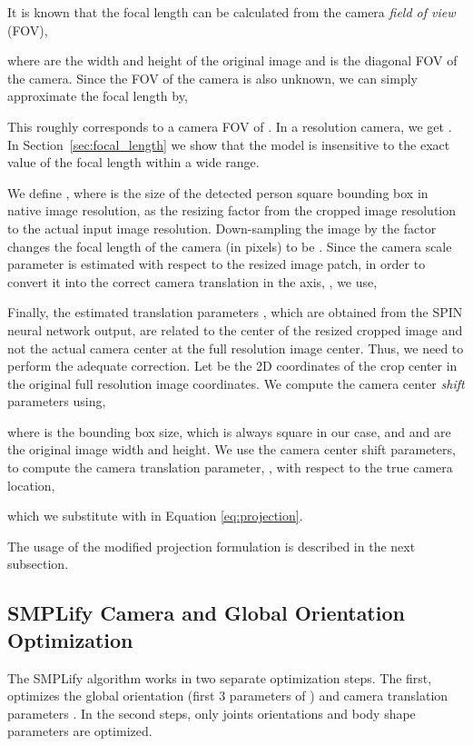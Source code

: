 \documentclass[runningheads]{llncs}
\begin{document}
It is known that the focal length can be calculated from the camera \emph{field of view} (FOV),

where  are the width and height of the original image and  is the diagonal FOV of the camera. Since the FOV of the camera is also unknown, we can simply approximate the focal length by,

This roughly corresponds to a camera FOV of . In a  resolution camera, we get . In Section~\ref{sec:focal_length} we show that the model is insensitive to the exact value of the focal length within a wide range. 

 We define , where  is the size of the detected person square bounding box in native image resolution, as the resizing factor from the  cropped image resolution to the actual input image resolution. Down-sampling the image by the factor  changes the focal length of the camera (in pixels) to be . Since the camera scale parameter  is estimated with respect to the resized image patch, in order to convert it into the correct camera translation in the  axis, , we use,






Finally, the estimated translation parameters , which are obtained from the SPIN neural network output, are related to the center of the resized cropped image and not the actual camera center at the full resolution image center. Thus, we need to perform the adequate correction.  Let  be the 2D coordinates of the crop center in the original full resolution image coordinates. We compute the  camera center \emph{shift} parameters using,

where  is the bounding box size, which is always square in our case, and  and  are the original image width and height.
We use the camera center shift parameters,  to compute the camera translation parameter, , with respect to the true camera location,

which we substitute with  in Equation \ref{eq:projection}.

The usage of the modified projection formulation is described in the next subsection.

\subsection{SMPLify Camera and Global Orientation Optimization}
\label{sec:smplify_camera_opt}
The SMPLify algorithm works in two separate optimization steps. The first, optimizes the global orientation (first 3 parameters of ) and camera translation parameters . In the second steps, only joints orientations  and body shape parameters  are optimized. 
\end{document}

